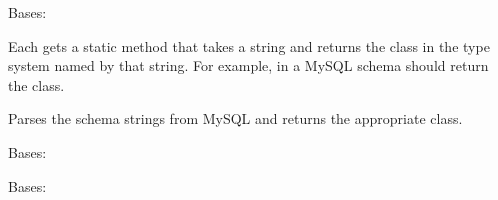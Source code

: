 \documentclass[letterpaper,10pt,english]{sphinxmanual}
\begin{document}

\begin{fulllineitems}
\label{\detokenize{api:nanostream.utils.data_structures.MySQLTypeSystem}}
Bases: {\hyperref[\detokenize{api:nanostream.utils.data_structures.DataSourceTypeSystem}]{}}

Each  gets a  static method that takes a
string and returns the class in the type system named by that string.
For example,  in a MySQL schema should return the
 class.

\begin{fulllineitems}
\label{\detokenize{api:nanostream.utils.data_structures.MySQLTypeSystem.type_mapping}}
Parses the schema strings from MySQL and returns the appropriate class.

\end{fulllineitems}


\end{fulllineitems}


\begin{fulllineitems}
\label{\detokenize{api:nanostream.utils.data_structures.PrimitiveTypeSystem}}
Bases: {\hyperref[\detokenize{api:nanostream.utils.data_structures.DataSourceTypeSystem}]{}}

\end{fulllineitems}


\begin{fulllineitems}
\label{\detokenize{api:nanostream.utils.data_structures.PythonTypeSystem}}
Bases: {\hyperref[\detokenize{api:nanostream.utils.data_structures.DataSourceTypeSystem}]{}}

\end{fulllineitems}
\end{document}
